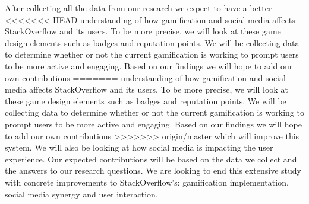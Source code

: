 \documentclass{sigchi}
\begin{document}
After collecting all the data from our research we expect to have a better
<<<<<<< HEAD
understanding of how gamification and social media affects StackOverflow and
its users. To be more precise, we will look at these game design elements
such as badges and reputation points. We will be collecting data to determine 
whether or not the current gamification is working to prompt users to be more 
active and engaging. Based on our findings we will hope to add our own contributions
=======
understanding of how gamification and social media affects StackOverflow and its
users. To be more precise, we will look at these game design elements such as
badges and reputation points. We will be collecting data to determine  whether
or not the current gamification is working to prompt users to be more active
and engaging. Based on our findings we will hope to add our own contributions
>>>>>>> origin/master
which will improve this system. We will also be looking at how social media is
impacting the user experience. Our expected contributions will be based on the
data we collect and the answers to our research questions. We are looking to
end this extensive study with concrete improvements to StackOverflow’s:
gamification implementation, social media synergy and user interaction.




% 
% 
\end{document}
